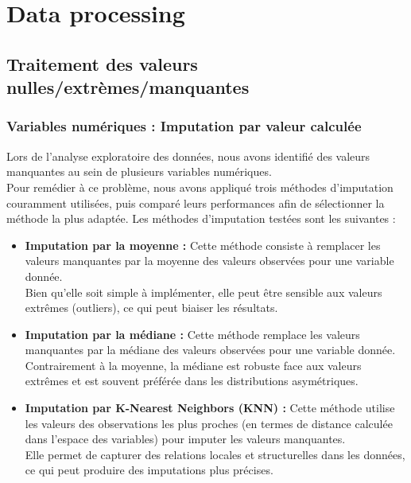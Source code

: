 \documentclass[a4paper,12pt]{report}
\begin{document}
\chapter{Data processing}

\section{Traitement des valeurs nulles/extrèmes/manquantes}

\subsection{Variables numériques : Imputation par valeur calculée}

Lors de l’analyse exploratoire des données, nous avons identifié des valeurs manquantes au sein de plusieurs variables numériques.\\
Pour remédier à ce problème, nous avons appliqué trois méthodes d’imputation couramment utilisées, puis comparé leurs performances afin de sélectionner la méthode la plus adaptée.
Les méthodes d’imputation testées sont les suivantes :

\bigbreak

\begin{itemize}
  \item{ \textbf{Imputation par la moyenne :} \newline
    Cette méthode consiste à remplacer les valeurs manquantes par la moyenne des valeurs observées pour une variable donnée.\\
    Bien qu’elle soit simple à implémenter, elle peut être sensible aux valeurs extrêmes (outliers), ce qui peut biaiser les résultats.
  }
  \item{ \textbf{Imputation par la médiane :} \newline
    Cette méthode remplace les valeurs manquantes par la médiane des valeurs observées pour une variable donnée.\\
    Contrairement à la moyenne, la médiane est robuste face aux valeurs extrêmes et est souvent préférée dans les distributions asymétriques.
  }
  \item{ \textbf{Imputation par K-Nearest Neighbors (KNN) :} \newline
    Cette méthode utilise les valeurs des observations les plus proches (en termes de distance   calculée dans l’espace des variables) pour imputer les valeurs manquantes.\\
    Elle permet de capturer des relations locales et structurelles dans les données, ce qui peut produire des imputations plus précises.
  }
\end{itemize}
\end{document}
